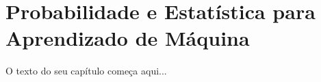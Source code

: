 
\chapter{Probabilidade e Estatística para Aprendizado de Máquina}
\label{cap:probabilidade-e-estatistica-ia}

O texto do seu capítulo começa aqui...
